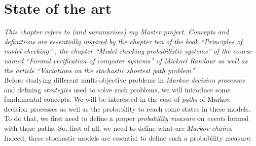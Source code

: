 \chapter{State of the art}
\textit{This chapter refers to (and summarises) my Master project. Concepts and definitions are essentially inspired by the chapter ten of the book ``Principles of model checking'' \cite{PMC}, the chapter ``Model checking probabilistic systems'' of the course named ``Formal verification of computer systems'' of Mickael Randour \cite{MRV} as well as the article ``Variations on the stochastic shortest path problem'' \cite{DBLP:journals/corr/RandourRS14a}.} \\

Before studying different multi-objective problems in \textit{Markov decision
processes} and defining \textit{strategies} used to solve such problems, we will introduce some fundamental concepts. We will be interested in the cost of \textit{paths} of Markov decision processes as well as the probability to reach some states in these models.
To do that, we first need to define a proper \textit{probability measure} on \textit{events} formed with these paths.
So, first of all, we need to define what are \textit{Markov chains}.
Indeed, these stochastic models are essential to define such a probability measure.

